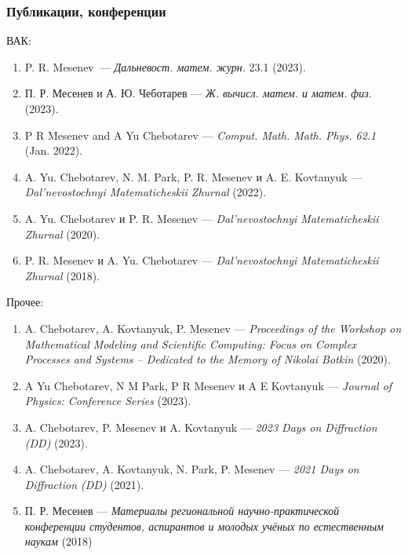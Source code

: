 \begin{frame} %
    \frametitle{Публикации, конференции}
    ВАК:
    \small{
        \begin{enumerate}
            \item P. R. Mesenev\ — \textit{Дальневост. матем. журн.} 23.1 (2023).

            \item П. Р. Месенев и А. Ю. Чеботарев
            — \textit{Ж. вычисл. матем. и матем. физ.} (2023).

            \item P R Mesenev and A Yu Chebotarev
            — \textit{Comput. Math. Math. Phys. 62.1} (Jan. 2022).

            \item A. Yu. Chebotarev, N. M. Park, P. R. Mesenev и A. E. Kovtanyuk
            — \textit{Dal’nevostochnyi Matematicheskii Zhurnal} (2022).

            \item A. Yu. Chebotarev и P. R. Mesenev
            — \textit{Dal’nevostochnyi Matematicheskii Zhurnal} (2020).

            \item P. R. Mesenev и A. Yu. Chebotarev
            — \textit{Dal’nevostochnyi Matematicheskii Zhurnal} (2018).
        \end{enumerate}
    }
    Прочее:
    \small{
        \begin{enumerate}
            \item A. Chebotarev, A. Kovtanyuk, P. Mesenev
            — \textit{Proceedings
            of the Workshop on Mathematical Modeling and Scientific Computing:
            Focus on Complex Processes and Systems – Dedicated to the Memory of
            Nikolai Botkin} (2020).

            \item A Yu Chebotarev, N M Park, P R Mesenev и A E Kovtanyuk
            — \textit{ Journal of Physics: Conference Series} (2023).

            \item A. Chebotarev, P. Mesenev и A. Kovtanyuk
            — \textit{2023 Days on Diffraction (DD)} (2023).

            \item A. Chebotarev, A. Kovtanyuk, N. Park, P. Mesenev
            — \textit {2021 Days on Diffraction (DD)} (2021).

            \item П. Р. Месенев
            — \textit{Материалы региональной научно-практической
             конференции студентов, аспирантов и молодых учёных по
            естественным наукам} (2018)
        \end{enumerate}
    }


\end{frame}
